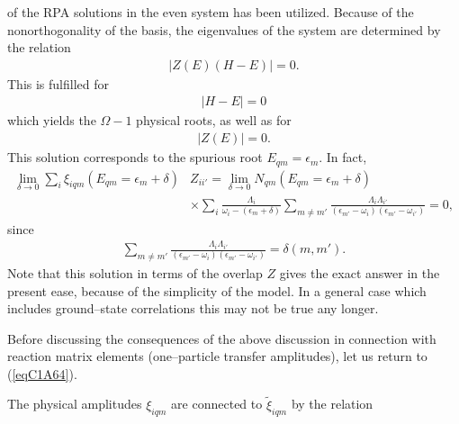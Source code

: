 of the RPA solutions in the even system has been utilized. Because of the nonorthogonality of the basis, the eigenvalues of the system are determined 
by the relation 
\begin{align}\label{eqC1A69} 
 \left|Z(E)(H-E)\right|=0.
  \end{align}
This is fulfilled for 
\begin{align}\label{eqC1A70} 
 \left|H-E\right|=0
  \end{align}
  which yields the $\Omega-1$ physical roots, as well as for 
\begin{align}\label{eqC1A71} 
 |Z(E)|=0.
  \end{align}
This solution corresponds to the spurious root $E_{qm}=\epsilon_m$. In fact, 
\begin{align}\label{eqC1A72} 
\nonumber \lim_{\delta\rightarrow0}\sum_i\xi_{iqm}(E_{qm}=\epsilon_m+\delta)&Z_{ii'}=\lim_{\delta\rightarrow0}N_{qm}(E_{qm}=\epsilon_m+\delta)\\
 &\times\sum_i\frac{\Lambda_i}{\omega_i-(\epsilon_m+\delta)}\sum_{m\neq m'}\frac{\Lambda_i\Lambda_{i'}}{(\epsilon_{m'}-\omega_i)(\epsilon_{m'}-\omega_{i'})}=0,
  \end{align}
  since
  \begin{align}\label{eqC1A72b} 
  \sum_{m\neq m'}\frac{\Lambda_i\Lambda_{i'}}{(\epsilon_{m'}-\omega_i)(\epsilon_{m'}-\omega_{i'})}=\delta(m,m').
    \end{align} 
Note that this solution in terms of the overlap $Z$ gives the exact answer in the present ease, because of the simplicity of the model. In a general case which includes ground--state correlations this may not be true any longer. 


Before discussing the consequences of the above discussion in connection with reaction matrix elements (one--particle transfer amplitudes), let us return to (\ref{eqC1A64}).

The physical amplitudes $\xi_{iqm}$ are connected to $\tilde \xi_{iqm}$ by the relation

